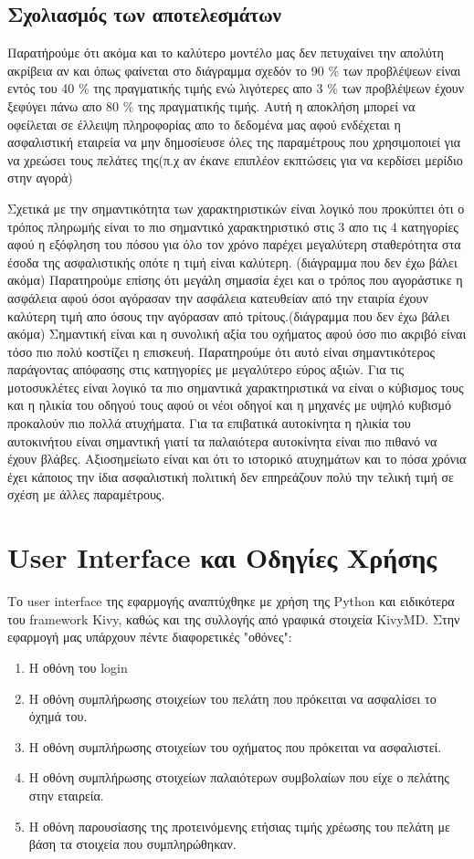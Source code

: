 \documentclass{llncs}
\begin{document}
\subsection{Σχολιασμός των αποτελεσμάτων}
\newpage
Παρατήρούμε ότι ακόμα και το καλύτερο 
μοντέλο μας δεν πετυχαίνει την απολύτη ακρίβεια αν και όπως φαίνεται
στο διάγραμμα σχεδόν το 90 \% των προβλέψεων είναι εντός του 40 \% της πραγματικής τιμής
ενώ λιγότερες απο 3 \% των προβλέψεων έχουν ξεφύγει πάνω απο 80 \% της πραγματικής τιμής.
Αυτή η αποκλήση μπορεί να οφείλεται σε έλλειψη πληροφορίας απο το δεδομένα μας αφού ενδέχεται
η ασφαλιστική εταιρεία να μην δημοσίευσε όλες της παραμέτρους που χρησιμοποιεί για να 
χρεώσει τους πελάτες της(π.χ αν έκανε επιπλέον εκπτώσεις για να κερδίσει μερίδιο στην αγορά)

Σχετικά με την σημαντικότητα των χαρακτηριστικών είναι λογικό που προκύπτει ότι ο τρόπος πληρωμής 
είναι το πιο σημαντικό χαρακτηριστικό στις 3 απο τις 4 κατηγορίες αφού η εξόφληση του πόσου
για όλο τον χρόνο παρέχει μεγαλύτερη σταθερότητα στα έσοδα της ασφαλιστικής οπότε η τιμή είναι
καλύτερη. (διάγραμμα που δεν έχω βάλει ακόμα)
Παρατηρούμε επίσης ότι μεγάλη σημασία έχει και ο τρόπος που αγοράστικε η ασφάλεια αφού 
όσοι αγόρασαν την ασφάλεια κατευθείαν από την εταιρία έχουν καλύτερη τιμή απο όσους την 
αγόρασαν από τρίτους.(διάγραμμα που δεν έχω βάλει ακόμα)
Σημαντική είναι και η συνολική αξία του οχήματος αφού όσο πιο ακριβό είναι τόσο πιο πολύ
κοστίζει η επισκευή. Παρατηρούμε ότι αυτό είναι σημαντικότερος παράγοντας απόφασης στις
κατηγορίες με μεγαλύτερο εύρος αξιών.
Για τις μοτοσυκλέτες είναι λογικό 
τα πιο σημαντικά χαρακτηριστικά να είναι ο κύβισμος τους και η ηλικία του οδηγού τους αφού
οι νέοι οδηγοί και η μηχανές με υψηλό κυβισμό προκαλούν πιο πολλά ατυχήματα.
Για τα επιβατικά αυτοκίνητα η ηλικία του αυτοκινήτου είναι σημαντική γιατί τα παλαιότερα αυτοκίνητα
είναι πιο πιθανό να έχουν βλάβες.
Αξιοσημείωτο είναι και ότι το ιστορικό ατυχημάτων και το πόσα χρόνια έχει κάποιος την 
ίδια ασφαλιστική πολιτική δεν επηρεάζουν πολύ την τελική τιμή 
σε σχέση με άλλες παραμέτρους.


\section{User Interface και Οδηγίες Χρήσης}
Το user interface της εφαρμογής αναπτύχθηκε με χρήση της Python και ειδικότερα του framework Kivy, καθώς και της συλλογής από γραφικά στοιχεία KivyMD. Στην εφαρμογή μας υπάρχουν πέντε διαφορετικές "οθόνες":
\begin{enumerate}
    \item Η οθόνη του login
    \item Η οθόνη συμπλήρωσης στοιχείων του πελάτη που πρόκειται να ασφαλίσει το όχημά του.
    \item Η οθόνη συμπλήρωσης στοιχείων του οχήματος που πρόκειται να ασφαλιστεί.
    \item Η οθόνη συμπλήρωσης στοιχείων παλαιότερων συμβολαίων που είχε ο πελάτης στην εταιρεία.
    \item Η οθόνη παρουσίασης της προτεινόμενης ετήσιας τιμής χρέωσης του πελάτη με βάση τα στοιχεία που συμπληρώθηκαν.
\end{enumerate}
\end{document}
